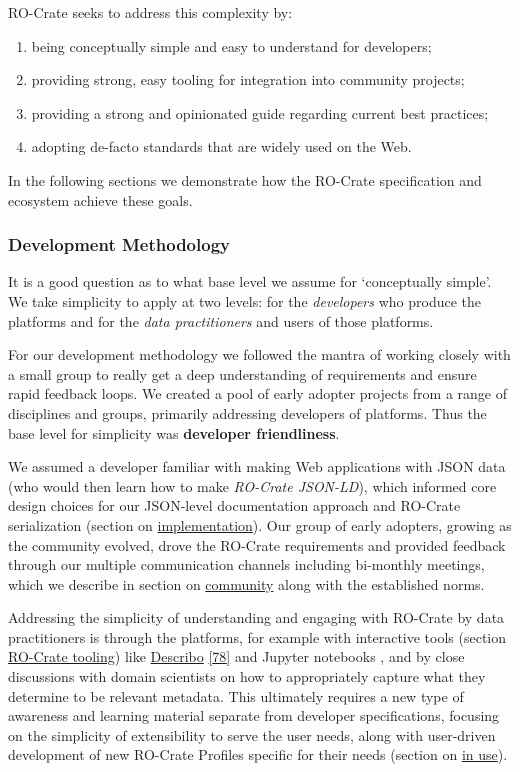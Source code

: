 {RO-Crate seeks to address this complexity by:

\begin{enumerate}
\def\labelenumi{\arabic{enumi}.}
\tightlist
\item
  being conceptually simple and easy to understand for developers;
\item
  providing strong, easy tooling for integration into community
  projects;
\item
  providing a strong and opinionated guide regarding current best
  practices;
\item
  adopting de-facto standards that are widely used on the Web.
\end{enumerate}

In the following sections we demonstrate how the RO-Crate specification
and ecosystem achieve these goals.

\hypertarget{methodology}{%
\subsubsection{Development Methodology}\label{methodology}}

It is a good question as to what base level we assume for `conceptually
simple'. We take simplicity to apply at two levels: for the
\emph{developers} who produce the platforms and for the \emph{data
practitioners} and users of those platforms.

For our development methodology we followed the mantra of working
closely with a small group to really get a deep understanding of
requirements and ensure rapid feedback loops. We created a pool of early
adopter projects from a range of disciplines and groups, primarily
addressing developers of platforms. Thus the base level for simplicity
was \textbf{developer friendliness}.

We assumed a developer familiar with making Web applications with JSON
data (who would then learn how to make \emph{RO-Crate JSON-LD}), which
informed core design choices for our JSON-level documentation approach
and RO-Crate serialization (section on
\protect\hyperlink{implementation}{implementation}). Our group of early
adopters, growing as the community evolved, drove the RO-Crate
requirements and provided feedback through our multiple communication
channels including bi-monthly meetings, which we describe in section on
\protect\hyperlink{community}{community} along with the established
norms.

Addressing the simplicity of understanding and engaging with RO-Crate by
data practitioners is through the platforms, for example with
interactive tools (section \protect\hyperlink{tooling}{RO-Crate
tooling}) like
\href{https://arkisto-platform.github.io/describo/}{Describo}
\href{https://arkisto-platform.github.io/describo/}{{[}78{]}} and
Jupyter notebooks
\cite{ch5-70}, and by
close discussions with domain scientists on how to appropriately capture
what they determine to be relevant metadata. This ultimately requires a
new type of awareness and learning material separate from developer
specifications, focusing on the simplicity of extensibility to serve the
user needs, along with user-driven development of new RO-Crate Profiles
specific for their needs (section on \protect\hyperlink{inuse}{in use}).

}
